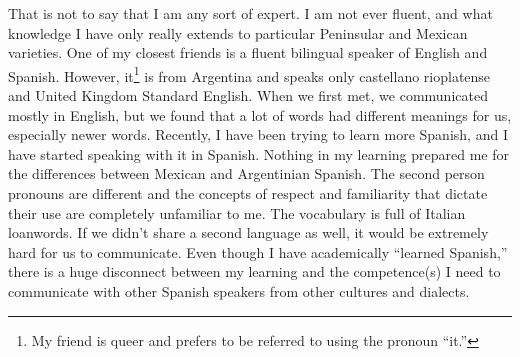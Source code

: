\documentclass[man,12pt,natbib]{apa6}
\begin{document}
That is not to say that I am any sort of expert. I am not ever fluent, and what
knowledge I have only really extends to particular Peninsular and Mexican
varieties. One of my closest friends is a fluent bilingual speaker of English
and Spanish. However, it\footnote{My friend is queer and prefers to be referred
to using the pronoun ``it.''} is from Argentina and speaks only castellano
rioplatense and United Kingdom Standard English. When we first met, we
communicated mostly in English, but we found that a lot of words had different
meanings for us, especially newer words. Recently, I have been trying to learn
more Spanish, and I have started speaking with it in Spanish.  Nothing in my
learning prepared me for the differences between Mexican and Argentinian
Spanish. The second person pronouns are different and the concepts of respect
and familiarity that dictate their use are completely unfamiliar to me. The
vocabulary is full of Italian loanwords. If we didn't share a second language
as well, it would be extremely hard for us to communicate. Even though I have
academically ``learned Spanish,'' there is a huge disconnect between my
learning and the competence(s) I need to communicate with other Spanish
speakers from other cultures and dialects.
\end{document}
